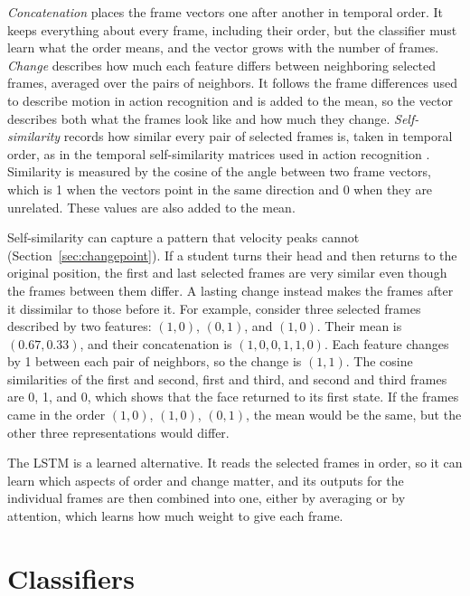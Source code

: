 \emph{Concatenation} places the frame vectors one after another in temporal order. It keeps everything about every frame, including their order, but the classifier must learn what the order means, and the vector grows with the number of frames. \emph{Change} describes how much each feature differs between neighboring selected frames, averaged over the pairs of neighbors. It follows the frame differences used to describe motion in action recognition \cite{wang2016} and is added to the mean, so the vector describes both what the frames look like and how much they change. \emph{Self-similarity} records how similar every pair of selected frames is, taken in temporal order, as in the temporal self-similarity matrices used in action recognition \cite{junejo2011}. Similarity is measured by the cosine of the angle between two frame vectors, which is 1 when the vectors point in the same direction and 0 when they are unrelated. These values are also added to the mean.

Self-similarity can capture a pattern that velocity peaks cannot (Section~\ref{sec:changepoint}). If a student turns their head and then returns to the original position, the first and last selected frames are very similar even though the frames between them differ. A lasting change instead makes the frames after it dissimilar to those before it. For example, consider three selected frames described by two features: $(1, 0)$, $(0, 1)$, and $(1, 0)$. Their mean is $(0.67, 0.33)$, and their concatenation is $(1, 0, 0, 1, 1, 0)$. Each feature changes by 1 between each pair of neighbors, so the change is $(1, 1)$. The cosine similarities of the first and second, first and third, and second and third frames are 0, 1, and 0, which shows that the face returned to its first state. If the frames came in the order $(1, 0)$, $(1, 0)$, $(0, 1)$, the mean would be the same, but the other three representations would differ.

The LSTM is a learned alternative. It reads the selected frames in order, so it can learn which aspects of order and change matter, and its outputs for the individual frames are then combined into one, either by averaging or by attention, which learns how much weight to give each frame.



\section{Classifiers}
\label{sec:classifiers}

